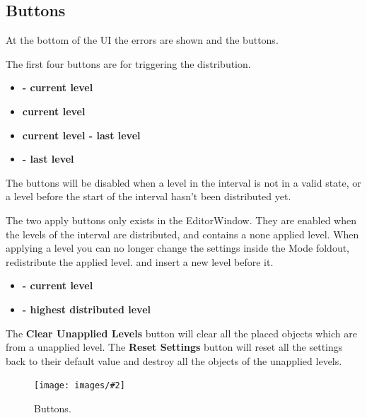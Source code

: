 \documentclass{paper}
\newlength{\imgwidth} %
\newcommand\scalegraphics[3][]
{
	\begin{figure}[H]
	\centering
	\settowidth{\imgwidth}{\texttt{[image: images/\#2]}} %
	\setlength{\imgwidth}{\minof{#1\imgwidth}{\textwidth}} %
	\texttt{[image: images/\#2]} %
	\caption{#3}
	\end{figure}
}
\newcommand*\bracket[1]{\lbrack#1\rbrack} %
\begin{document}
\newpage
\subsection{Buttons}\label{subsec:pdd_b}
At the bottom of the UI the errors are shown and the buttons.
\par
The first four buttons are for triggering the distribution.
\begin{itemize}
\item \textbf{\bracket{0 - current level}}
\item \textbf{\bracket{current level}}
\item \textbf{\bracket{current level - last level}}
\item \textbf{\bracket{0 - last level}}
\end{itemize}
The buttons will be disabled when a level in the interval is not in a valid state, or a level before the start of the interval hasn't been distributed yet.
\par
The two apply buttons only exists in the EditorWindow. They are enabled when the levels of the interval are distributed, and contains a none applied level. When applying a level you can no longer change the settings inside the Mode foldout, redistribute the applied level. and insert a new level before it.
\begin{itemize}
\item \textbf{\bracket{0 - current level}}
\item \textbf{\bracket{0 - highest distributed level}}
\end{itemize}

The \textbf{\bracket{Clear Unapplied Levels}} button will clear all the placed objects which are from a unapplied level. The \textbf{\bracket{Reset Settings}} button will reset all the settings back to their default value and destroy all the objects of the unapplied levels.
\scalegraphics[0.6]{Buttons.png}{Buttons.}

\newpage
{}

\end{document}
